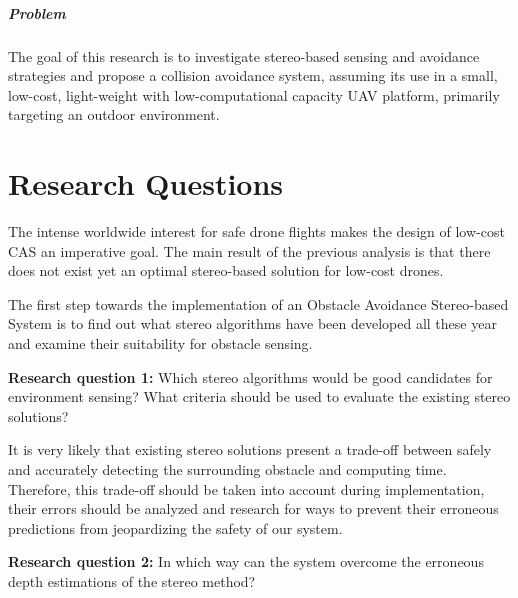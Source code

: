 \subparagraph*{Problem}

The goal of this research is to investigate stereo-based sensing and avoidance strategies and propose a collision avoidance system, assuming its use in a small, low-cost, light-weight with low-computational capacity \acs{UAV} platform, primarily targeting an outdoor environment.

\section{Research Questions}

The intense worldwide interest for safe drone flights makes the design of low-cost \ac{CAS} an imperative goal. The main result of the previous analysis is that there does not exist yet an optimal stereo-based solution for low-cost drones.

The first step towards the implementation of an Obstacle Avoidance Stereo-based System is to find out what stereo algorithms have been developed all these year and examine their suitability for obstacle sensing.

\begin{description}
	\item \textbf{Research question 1:} Which stereo algorithms would be good candidates for environment sensing? What criteria should be used to evaluate the existing stereo solutions?
\end{description}
	
It is very likely that existing stereo solutions present a trade-off between safely and accurately detecting the surrounding obstacle and computing time. Therefore, this trade-off should be taken into account during implementation, their errors should be analyzed and research for ways to prevent their erroneous predictions from jeopardizing the safety of our system.

\begin{description}
	\item \textbf{Research question 2:} In which way can the system overcome the erroneous depth estimations of the stereo method?
\end{description}
	
